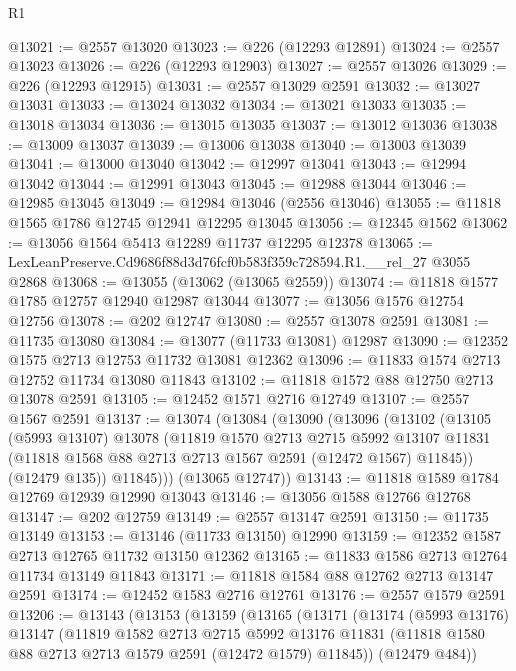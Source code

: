 \begin{lexlean}{R1}
\begin{coremodule}
@13021 := @2557 @13020
@13023 := @226 (@12293 @12891)
@13024 := @2557 @13023
@13026 := @226 (@12293 @12903)
@13027 := @2557 @13026
@13029 := @226 (@12293 @12915)
@13031 := @2557 @13029 @2591
@13032 := @13027 @13031
@13033 := @13024 @13032
@13034 := @13021 @13033
@13035 := @13018 @13034
@13036 := @13015 @13035
@13037 := @13012 @13036
@13038 := @13009 @13037
@13039 := @13006 @13038
@13040 := @13003 @13039
@13041 := @13000 @13040
@13042 := @12997 @13041
@13043 := @12994 @13042
@13044 := @12991 @13043
@13045 := @12988 @13044
@13046 := @12985 @13045
@13049 := @12984 @13046 (@2556 @13046)
@13055 := @11818 @1565 @1786 @12745 @12941 @12295 @13045
@13056 := @12345 @1562
@13062 := @13056 @1564 @5413 @12289 @11737 @12295 @12378
@13065 := LexLeanPreserve.Cd9686f88d3d76fcf0b583f359c728594.R1.__rel_27 @3055 @2868
@13068 := @13055 (@13062 (@13065 @2559))
@13074 := @11818 @1577 @1785 @12757 @12940 @12987 @13044
@13077 := @13056 @1576 @12754 @12756
@13078 := @202 @12747
@13080 := @2557 @13078 @2591
@13081 := @11735 @13080
@13084 := @13077 (@11733 @13081) @12987
@13090 := @12352 @1575 @2713 @12753 @11732 @13081 @12362
@13096 := @11833 @1574 @2713 @12752 @11734 @13080 @11843
@13102 := @11818 @1572 @88 @12750 @2713 @13078 @2591
@13105 := @12452 @1571 @2716 @12749
@13107 := @2557 @1567 @2591
@13137 := @13074
    (@13084
      (@13090
        (@13096
          (@13102
            (@13105
              (@5993 @13107)
              @13078
              (@11819
                @1570
                @2713
                @2715
                @5992
                @13107
                @11831
                (@11818 @1568 @88 @2713 @2713 @1567 @2591 (@12472 @1567) @11845))
              (@12479 @135))
            @11845)))
      (@13065 @12747))
@13143 := @11818 @1589 @1784 @12769 @12939 @12990 @13043
@13146 := @13056 @1588 @12766 @12768
@13147 := @202 @12759
@13149 := @2557 @13147 @2591
@13150 := @11735 @13149
@13153 := @13146 (@11733 @13150) @12990
@13159 := @12352 @1587 @2713 @12765 @11732 @13150 @12362
@13165 := @11833 @1586 @2713 @12764 @11734 @13149 @11843
@13171 := @11818 @1584 @88 @12762 @2713 @13147 @2591
@13174 := @12452 @1583 @2716 @12761
@13176 := @2557 @1579 @2591
@13206 := @13143
    (@13153
      (@13159
        (@13165
          (@13171
            (@13174
              (@5993 @13176)
              @13147
              (@11819
                @1582
                @2713
                @2715
                @5992
                @13176
                @11831
                (@11818 @1580 @88 @2713 @2713 @1579 @2591 (@12472 @1579) @11845))
              (@12479 @484))

\end{coremodule}
\end{lexlean}
